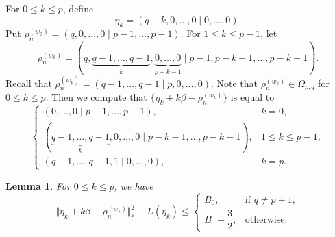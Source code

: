 \documentclass[11pt]{amsart}
\theoremstyle{plain}
\newtheorem{lemma}[thm]{Lemma}
\theoremstyle{definition}
\newcommand{\frk}{\mathfrak{k}}
\begin{document}
For $0\le k\le p$, define
\[\eta_k=(q-k,0,\dots,0\mid 0,\dots,0).\]
Put $\rho_n^{(w_0)}=(q, 0, \dots, 0 \mid p-1, \dots, p-1)$. For $1\leq k\leq p-1$, let
\[
\rho_n^{(w_k)}=
	(q, \underbrace{q-1, \dots, q-1}_k, \underbrace{0, \dots, 0}_{p-k-1}\mid p-1, p-k-1, \dots, p-k-1).
\]
Recall that $\rho_n^{(w_p)}=(q-1, \dots, q-1\mid p, 0, \dots, 0)$.
Note that $\rho_n^{(w_k)}\in \Omega_{p, q}$ for $0\leq k\leq p$.
Then we compute that $\{\eta_k + k\beta - \rho_n^{(w_k)}\}$ is equal to
\begin{equation}\label{eta-k}
\begin{cases}
(0, \dots, 0 \mid p-1, \dots, p-1), & k = 0, \\
(\underbrace{q-1, \dots, q-1}_{k}, 0, \dots, 0 \mid p-k-1, \dots, p-k-1), & 1 \le k \le p-1, \\
(q-1, \dots, q-1, 1 \mid 0, \dots, 0), & k = p.
\end{cases}
\end{equation}

\begin{lemma}\label{lemma-etak}
For  $0\le k\le p$, we have
\begin{equation}\label{weight-2}
\Vert\eta_k+k\beta-\rho_n^{(w_k)}\Vert_\frk^2-L(\eta_k)\le\left\{
\begin{array}{ll}
			B_0, &  \mbox{if } q\neq p+1,\\
			B_0+\dfrac{3}{2}, & \mbox{otherwise}.
		\end{array}
		\right.
\end{equation}
\end{lemma}
\end{document}
